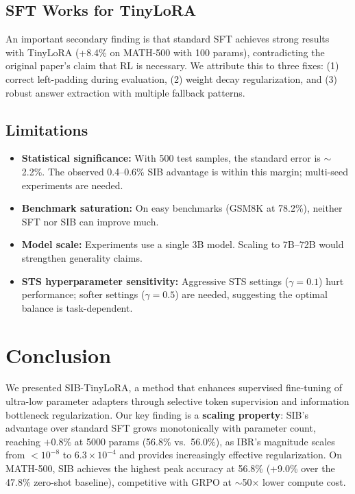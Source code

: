 \documentclass{article}
\begin{document}
\subsection{SFT Works for TinyLoRA}

An important secondary finding is that standard SFT achieves strong results with TinyLoRA (+8.4\% on MATH-500 with 100 params), contradicting the original paper's claim that RL is necessary. We attribute this to three fixes: (1) correct left-padding during evaluation, (2) weight decay regularization, and (3) robust answer extraction with multiple fallback patterns.

\subsection{Limitations}

\begin{itemize}[leftmargin=*]
  \item \textbf{Statistical significance:} With 500 test samples, the standard error is $\sim$2.2\%. The observed 0.4--0.6\% SIB advantage is within this margin; multi-seed experiments are needed.
  \item \textbf{Benchmark saturation:} On easy benchmarks (GSM8K at 78.2\%), neither SFT nor SIB can improve much.
  \item \textbf{Model scale:} Experiments use a single 3B model. Scaling to 7B--72B would strengthen generality claims.
  \item \textbf{STS hyperparameter sensitivity:} Aggressive STS settings ($\gamma = 0.1$) hurt performance; softer settings ($\gamma = 0.5$) are needed, suggesting the optimal balance is task-dependent.
\end{itemize}

\section{Conclusion}

We presented SIB-TinyLoRA, a method that enhances supervised fine-tuning of ultra-low parameter adapters through selective token supervision and information bottleneck regularization. Our key finding is a \textbf{scaling property}: SIB's advantage over standard SFT grows monotonically with parameter count, reaching $+0.8$\% at 5000 params (56.8\% vs.~56.0\%), as IBR's magnitude scales from $<10^{-8}$ to $6.3 \times 10^{-4}$ and provides increasingly effective regularization. On MATH-500, SIB achieves the highest peak accuracy at 56.8\% (+9.0\% over the 47.8\% zero-shot baseline), competitive with GRPO at $\sim$50$\times$ lower compute cost.
\end{document}
